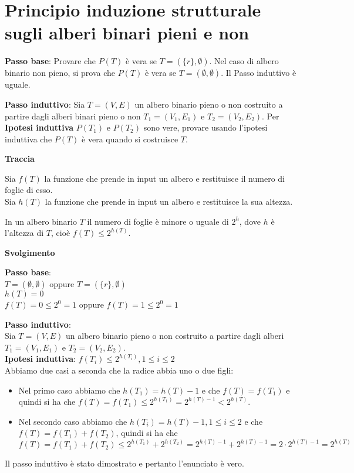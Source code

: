 \section{Principio induzione strutturale sugli alberi binari pieni e non}
\textbf{Passo base}: Provare che $P(T)$ è vera se $T=(\{r\}, \emptyset)$. Nel caso di albero binario non pieno, si prova che $P(T)$ è vera se $T=(\emptyset, \emptyset)$. Il Passo induttivo è uguale.

\textbf{Passo induttivo}: Sia $T=(V,E)$ un albero binario pieno o non costruito a partire dagli alberi binari pieno o non $T_1=(V_1, E_1)$ e $T_2=(V_2, E_2)$. Per \textbf{Ipotesi induttiva} $P(T_1)$ e $P(T_2)$ sono vere, provare usando l'ipotesi induttiva che $P(T)$ è vera quando si costruisce $T$.
\begin{example}
\phantom{}
\centerline{\textbf{Traccia}}
Sia $f(T)$ la funzione che prende in input un albero e restituisce il numero di foglie di esso. \\
Sia $h(T)$ la funzione che prende in input un albero e restituisce la sua altezza.

In un albero binario $T$ il numero di foglie è minore o uguale di $2^h$, dove $h$ è l'altezza di $T$, cioè $f(T) \le 2^{h(T)}$.

\centerline{\textbf{Svolgimento}}

\textbf{Passo base}: \\
$T=(\emptyset, \emptyset)$ oppure $T=(\{r\}, \emptyset)$ \\
$h(T) = 0$ \\
$f(T) = 0 \le 2^0 = 1$ oppure $f(T) = 1 \le 2^0 = 1$

\textbf{Passo induttivo}: \\
Sia $T=(V, E)$ un albero binario pieno o non costruito a partire dagli alberi $T_1=(V_1, E_1)$ e $T_2=(V_2, E_2)$. \\
\textbf{Ipotesi induttiva}: $f(T_i) \le 2^{h(T_i)}, 1 \le i \le 2$ \\
Abbiamo due casi a seconda che la radice abbia uno o due figli:
\begin{itemize}
    \item Nel primo caso abbiamo che $h(T_1) = h(T) - 1$ e che $f(T)=f(T_1)$ e quindi si ha che $f(T) = f(T_1) \le 2^{h(T_1)} = 2^{h(T) - 1} < 2^{h(T)}$.
    \item Nel secondo caso abbiamo che $h(T_i) = h(T) - 1, 1 \le i \le 2$ e che $f(T) = f(T_1) + f(T_2)$, quindi si ha che $f(T) = f(T_1) + f(T_2) \le 2^{h(T_1)} + 2^{h(T_2)} = 2^{h(T)-1} + 2^{h(T)-1} = 2 \cdot 2^{h(T) - 1} = 2^{h(T)}$
\end{itemize}

Il passo induttivo è stato dimostrato e pertanto l'enunciato è vero.

\end{example}